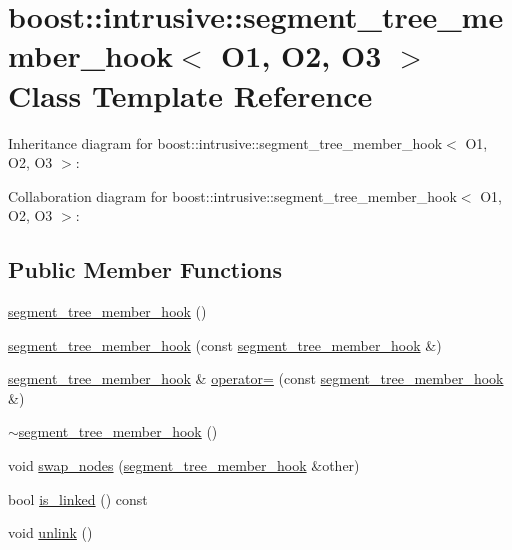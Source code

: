 \hypertarget{classboost_1_1intrusive_1_1segment__tree__member__hook}{}\section{boost\+:\+:intrusive\+:\+:segment\+\_\+tree\+\_\+member\+\_\+hook$<$ O1, O2, O3 $>$ Class Template Reference}
\label{classboost_1_1intrusive_1_1segment__tree__member__hook}


Inheritance diagram for boost\+:\+:intrusive\+:\+:segment\+\_\+tree\+\_\+member\+\_\+hook$<$ O1, O2, O3 $>$\+:


Collaboration diagram for boost\+:\+:intrusive\+:\+:segment\+\_\+tree\+\_\+member\+\_\+hook$<$ O1, O2, O3 $>$\+:
\subsection*{Public Member Functions}
\begin{DoxyCompactItemize}
\item 
\hyperlink{classboost_1_1intrusive_1_1segment__tree__member__hook_af6992ec25a4e0a1421f037fd6572e287}{segment\+\_\+tree\+\_\+member\+\_\+hook} ()
\item 
\hyperlink{classboost_1_1intrusive_1_1segment__tree__member__hook_aebb65dd4bf3d806ad865e695bd049a53}{segment\+\_\+tree\+\_\+member\+\_\+hook} (const \hyperlink{classboost_1_1intrusive_1_1segment__tree__member__hook}{segment\+\_\+tree\+\_\+member\+\_\+hook} \&)
\item 
\hyperlink{classboost_1_1intrusive_1_1segment__tree__member__hook}{segment\+\_\+tree\+\_\+member\+\_\+hook} \& \hyperlink{classboost_1_1intrusive_1_1segment__tree__member__hook_a318a273a207a6eb05882649e986b403e}{operator=} (const \hyperlink{classboost_1_1intrusive_1_1segment__tree__member__hook}{segment\+\_\+tree\+\_\+member\+\_\+hook} \&)
\item 
\hyperlink{classboost_1_1intrusive_1_1segment__tree__member__hook_aec7f97a1225f1623af0587dfb049fe79}{$\sim$segment\+\_\+tree\+\_\+member\+\_\+hook} ()
\item 
void \hyperlink{classboost_1_1intrusive_1_1segment__tree__member__hook_a53f587840e009b7bee437e1be531b428}{swap\+\_\+nodes} (\hyperlink{classboost_1_1intrusive_1_1segment__tree__member__hook}{segment\+\_\+tree\+\_\+member\+\_\+hook} \&other)
\item 
bool \hyperlink{classboost_1_1intrusive_1_1segment__tree__member__hook_ad0724b6dcff7e71fde0365fc04ceaca3}{is\+\_\+linked} () const
\item 
void \hyperlink{classboost_1_1intrusive_1_1segment__tree__member__hook_abef6cb855778d20e59b11e0f05722ad2}{unlink} ()
\end{DoxyCompactItemize}


